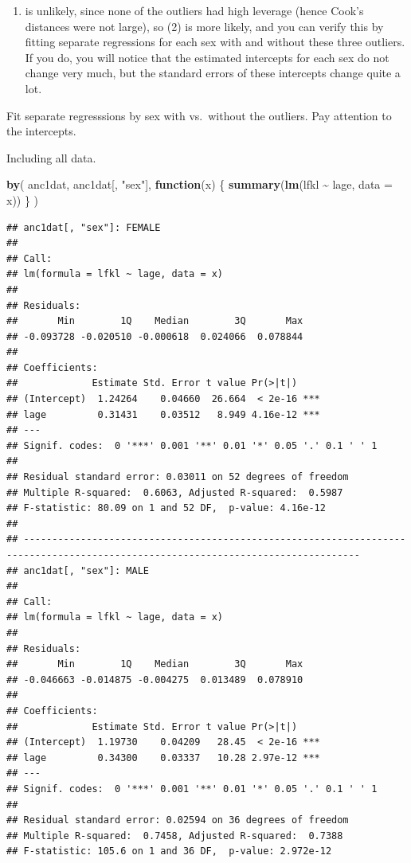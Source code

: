 \documentclass[
  12pt,
]{book}
\makeatletter
\newenvironment{Shaded}{\begin{snugshade}}{\end{snugshade}}
\newcommand{\ControlFlowTok}[1]{\textcolor[rgb]{0.13,0.29,0.53}{\textbf{#1}}}
\newcommand{\DataTypeTok}[1]{\textcolor[rgb]{0.13,0.29,0.53}{#1}}
\newcommand{\KeywordTok}[1]{\textcolor[rgb]{0.13,0.29,0.53}{\textbf{#1}}}
\newcommand{\NormalTok}[1]{#1}
\newcommand{\OperatorTok}[1]{\textcolor[rgb]{0.81,0.36,0.00}{\textbf{#1}}}
\newcommand{\StringTok}[1]{\textcolor[rgb]{0.31,0.60,0.02}{#1}}
\providecommand{\tightlist}{%
  \setlength{\itemsep}{0pt}\setlength{\parskip}{0pt}}
\newenvironment{kframe}{%
\medskip{}
\setlength{\fboxsep}{.8em}
\def\at@end@of@kframe{}%
\ifinner\ifhmode%
 \def\at@end@of@kframe{\end{minipage}}%
 \begin{minipage}{\columnwidth}%
\fi\fi%
\def\FrameCommand##1{\hskip\@totalleftmargin \hskip-\fboxsep
\colorbox{incolor}{##1}\hskip-\fboxsep
    \hskip-\linewidth \hskip-\@totalleftmargin \hskip\columnwidth}%
\MakeFramed {\advance\hsize-\width
  \@totalleftmargin\z@ \linewidth\hsize
  \@setminipage}}%
{\par\unskip\endMakeFramed%
\at@end@of@kframe}
\newenvironment{rmdblock}[1]
 {
 \begin{itemize}
 \renewcommand{\labelitemi}{
   \raisebox{-.7\height}[0pt][0pt]{
     {\setkeys{Gin}{width=3em,keepaspectratio}\texttt{[image: images/\#1]}}
   }
 }
 \begin{kframe}
 \setlength{\fboxsep}{1em}
 \item
 }
 {
 \end{kframe}
 \end{itemize}
 }
\newenvironment{rmdcode}
  {\begin{rmdblock}{screen}}
  {\end{rmdblock}}
\makeatother
\begin{document}
\begin{enumerate}
\def\labelenumi{(\arabic{enumi})}
\tightlist
\item
  is unlikely, since none of the outliers had high leverage (hence Cook's distances were not large), so (2) is more likely, and you can verify this by fitting separate regressions for each sex with and without these three outliers. If you do, you will notice that the estimated intercepts for each sex do not change very much, but the standard errors of these intercepts change quite a lot.
\end{enumerate}

\begin{rmdcode}
Fit separate regresssions by sex with vs.~without the outliers. Pay attention to the intercepts.
\end{rmdcode}

Including all data.

\begin{Shaded}
\begin{Highlighting}[]
\KeywordTok{by}\NormalTok{(}
\NormalTok{  anc1dat,}
\NormalTok{  anc1dat[, }\StringTok{"sex"}\NormalTok{],}
  \ControlFlowTok{function}\NormalTok{(x) \{}
    \KeywordTok{summary}\NormalTok{(}\KeywordTok{lm}\NormalTok{(lfkl }\OperatorTok{\textasciitilde{}}\StringTok{ }\NormalTok{lage, }\DataTypeTok{data =}\NormalTok{ x))}
\NormalTok{  \}}
\NormalTok{)}
\end{Highlighting}
\end{Shaded}

\begin{verbatim}
## anc1dat[, "sex"]: FEMALE      
## 
## Call:
## lm(formula = lfkl ~ lage, data = x)
## 
## Residuals:
##       Min        1Q    Median        3Q       Max 
## -0.093728 -0.020510 -0.000618  0.024066  0.078844 
## 
## Coefficients:
##             Estimate Std. Error t value Pr(>|t|)    
## (Intercept)  1.24264    0.04660  26.664  < 2e-16 ***
## lage         0.31431    0.03512   8.949 4.16e-12 ***
## ---
## Signif. codes:  0 '***' 0.001 '**' 0.01 '*' 0.05 '.' 0.1 ' ' 1
## 
## Residual standard error: 0.03011 on 52 degrees of freedom
## Multiple R-squared:  0.6063, Adjusted R-squared:  0.5987 
## F-statistic: 80.09 on 1 and 52 DF,  p-value: 4.16e-12
## 
## --------------------------------------------------------------------------------------------------------------------------------- 
## anc1dat[, "sex"]: MALE        
## 
## Call:
## lm(formula = lfkl ~ lage, data = x)
## 
## Residuals:
##       Min        1Q    Median        3Q       Max 
## -0.046663 -0.014875 -0.004275  0.013489  0.078910 
## 
## Coefficients:
##             Estimate Std. Error t value Pr(>|t|)    
## (Intercept)  1.19730    0.04209   28.45  < 2e-16 ***
## lage         0.34300    0.03337   10.28 2.97e-12 ***
## ---
## Signif. codes:  0 '***' 0.001 '**' 0.01 '*' 0.05 '.' 0.1 ' ' 1
## 
## Residual standard error: 0.02594 on 36 degrees of freedom
## Multiple R-squared:  0.7458, Adjusted R-squared:  0.7388 
## F-statistic: 105.6 on 1 and 36 DF,  p-value: 2.972e-12
\end{verbatim}
\end{document}
